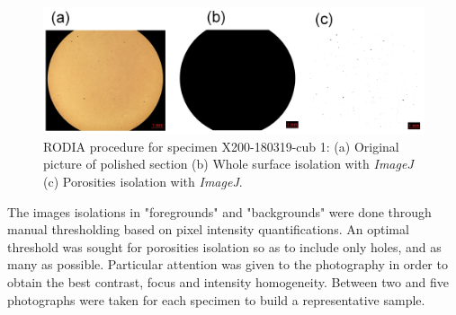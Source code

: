 \begin{center}
\begin{table}[h]
\noindent{}

\caption[Polishing routine for Al-Si alloys]{Polishing routine for Al-Si alloys}
\label{tab:pol}
\end{table}
\end{center}

\begin{figure}[h]
\centering
\centerline{\includegraphics[scale=0.29]{Images/ImageJ-cub1}}
\decoRule
\caption[RODIA procedure for specimen X200-180319-cub 1: (a) Original picture of polished section (b) Whole surface isolation with \textit{ImageJ} (c) Porosities isolation with \textit{ImageJ}]{RODIA procedure for specimen X200-180319-cub 1: (a) Original picture of polished section (b) Whole surface isolation with \textit{ImageJ} (c) Porosities isolation with \textit{ImageJ}.}
\label{fig:ImageJ}
\end{figure}

The images isolations in "foregrounds" and "backgrounds" were done through manual thresholding based on pixel intensity quantifications.  %
An optimal threshold was sought for porosities isolation so as to include only holes, and as many as possible. Particular attention was given to the photography in order to obtain the best contrast, focus and intensity homogeneity. Between two and five photographs were taken for each specimen to build a representative sample.

